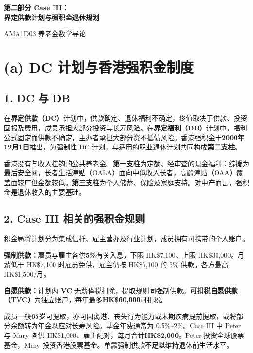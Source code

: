 \documentclass[12pt, letterpaper]{ctexart}
\begin{document}
\begin{titlepage}
  \centering
  \vspace*{2cm}
  {\LARGE\bfseries 第二部分 Case III：\\[0.4em]
  界定供款计划与强积金退休规划\par}
  \vspace{1.5cm}
  {\large AMA1D03 养老金数学导论\par}
  \vfill
\end{titlepage}
\setcounter{page}{1}

\section*{(a) DC 计划与香港强积金制度}

\subsection*{1. DC 与 DB}

在\textbf{界定供款（DC）}计划中，供款确定、退休福利不确定，终值取决于供款、投资回报及费用，成员承担大部分投资与长寿风险。在\textbf{界定福利（DB）}计划中，福利公式固定而供款不确定，主办者承担大部分资不抵债风险。香港强积金于\textbf{2000年12月1日}推出，为强制性 DC 计划，与适用的职业退休计划共同构成\textbf{第二支柱}。

香港没有与收入挂钩的公共养老金。\textbf{第一支柱}为定额、经审查的现金福利：综援为最后安全网，长者生活津贴（OALA）面向中低收入长者，高龄津贴（OAA）覆盖面较广但金额较低。\textbf{第三支柱}为个人储蓄、保险及家庭支持。对中产而言，强积金是退休收入的主要基础。

\subsection*{2. Case III 相关的强积金规则}

积金局将计划分为集成信托、雇主营办及行业计划，成员拥有可携带的个人账户。

\textbf{强制供款：}雇员与雇主各供\textbf{5\%}有关入息，下限 HK\$7,100、上限 HK\$30,000。月薪低于 HK\$7,100 时雇员免供，雇主仍按 HK\$7,100 的 5\% 供款。各方最高 HK\$1,500/月。

\textbf{自愿供款：}计划内 \textbf{VC} 无薪俸税扣除，提取规则同强制供款。\textbf{可扣税自愿供款（TVC）}为独立账户，每年最多\textbf{HK\$60,000}可扣税。

成员一般\textbf{65岁}可提取，亦可因离港、丧失行为能力或末期疾病提前提取，或将部分余额转为年金以应对长寿风险。基金年费通常为 0.5\%--2\%。Case III 中 Peter 与 Mary 各供 HK\$1,000、雇主配对，每月合计\textbf{HK\$2,000}。Peter 投资全球股票基金，Mary 投资香港股票基金。单靠强制供款\textbf{不足以}维持退休前生活水平。
\end{document}
